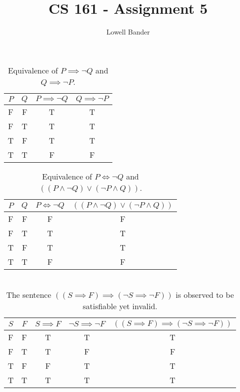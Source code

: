 \documentclass[]{article}
\begin{document}
\title{CS 161 - Assignment 5}
\author{Lowell Bander}
\maketitle

\section{}
\begin{table}[h]
\centering
\begin{tabular}{ c | c | c | c }
$P$ & $Q$ & $P \implies \neg Q$  & $Q \implies \neg P$ \\\hline
F & F & T & T\\
F & T & T & T\\
T & F & T & T\\
T & T & F & F\\
\end{tabular}
\caption{Equivalence of $P \implies \neg Q$  and $Q \implies \neg P$.}
\end{table}

\begin{table}[h]
\centering
\begin{tabular}{ c | c | c | c }
$P$ & $Q$ & $P \iff \neg Q$  & $((P \land \neg Q) \lor (\neg P \land Q))$ \\\hline
F & F & F & F\\
F & T & T & T\\
T & F & T & T\\
T & T & F & F\\
\end{tabular}
\caption{Equivalence of $P \iff \neg Q$  and $((P \land \neg Q) \lor (\neg P \land Q))$.}
\end{table}

\section{}

\begin{table}[h]
\centering
\begin{tabular}{ c | c | c | c | c}
$S$ & $F$ & $S \implies F$ & $\neg S \implies \neg F$ & $((S \implies F) \implies (\neg S \implies \neg F))$ \\\hline
F & F & T & T & T\\
F & T & T & F & F\\
T & F & F & T & T\\
T & T & T & T & T\\
\end{tabular}
\caption{The sentence $((S \implies F) \implies (\neg S \implies \neg F))$ is observed to be satisfiable yet invalid.}
\end{table}
\end{document}
